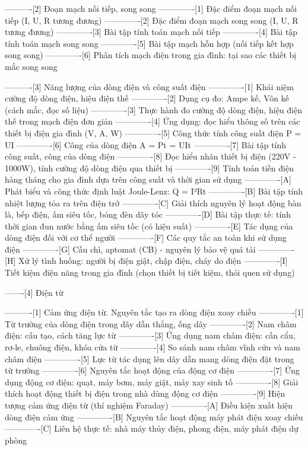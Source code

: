----------[2] Đoạn mạch nối tiếp, song song
-------------[1] Đặc điểm đoạn mạch nối tiếp (I, U, R tương đương)
-------------[2] Đặc điểm đoạn mạch song song (I, U, R tương đương)
-------------[3] Bài tập tính toán mạch nối tiếp
-------------[4] Bài tập tính toán mạch song song
-------------[5] Bài tập mạch hỗn hợp (nối tiếp kết hợp song song)
-------------[6] Phân tích mạch điện trong gia đình: tại sao các thiết bị mắc song song

----------[3] Năng lượng của dòng điện và công suất điện
-------------[1] Khái niệm cường độ dòng điện, hiệu điện thế
-------------[2] Dụng cụ đo: Ampe kế, Vôn kế (cách mắc, đọc số liệu)
-------------[3] Thực hành đo cường độ dòng điện, hiệu điện thế trong mạch điện đơn giản
-------------[4] Ứng dụng: đọc hiểu thông số trên các thiết bị điện gia đình (V, A, W)
-------------[5] Công thức tính công suất điện P = UI
-------------[6] Công của dòng điện A = Pt = UIt
-------------[7] Bài tập tính công suất, công của dòng điện
-------------[8] Đọc hiểu nhãn thiết bị điện (220V - 1000W), tính cường độ dòng điện qua thiết bị
-------------[9] Tính toán tiền điện hàng tháng cho gia đình dựa trên công suất và thời gian sử dụng
-------------[A] Phát biểu và công thức định luật Joule-Lenz: Q = I²Rt
-------------[B] Bài tập tính nhiệt lượng tỏa ra trên điện trở
-------------[C] Giải thích nguyên lý hoạt động bàn là, bếp điện, ấm siêu tốc, bóng đèn dây tóc
-------------[D] Bài tập thực tế: tính thời gian đun nước bằng ấm siêu tốc (có hiệu suất)
-------------[E] Tác dụng của dòng điện đối với cơ thể người
-------------[F] Các quy tắc an toàn khi sử dụng điện
-------------[G] Cầu chì, aptomat (CB) - nguyên lý bảo vệ quá tải
-------------[H] Xử lý tình huống: người bị điện giật, chập điện, cháy do điện
-------------[I] Tiết kiệm điện năng trong gia đình (chọn thiết bị tiết kiệm, thói quen sử dụng)

-------[4] Điện từ

----------[1] Cảm ứng điện từ. Nguyên tắc tạo ra dòng điện xoay chiều
-------------[1] Từ trường của dòng điện trong dây dẫn thẳng, ống dây
-------------[2] Nam châm điện: cấu tạo, cách tăng lực từ
-------------[3] Ứng dụng nam châm điện: cần cẩu, rơ-le, chuông điện, khóa cửa từ
-------------[4] So sánh nam châm vĩnh cửu và nam châm điện
-------------[5] Lực từ tác dụng lên dây dẫn mang dòng điện đặt trong từ trường
-------------[6] Nguyên tắc hoạt động của động cơ điện
-------------[7] Ứng dụng động cơ điện: quạt, máy bơm, máy giặt, máy xay sinh tố
-------------[8] Giải thích hoạt động thiết bị điện trong nhà dùng động cơ điện
-------------[9] Hiện tượng cảm ứng điện từ (thí nghiệm Faraday)
-------------[A] Điều kiện xuất hiện dòng điện cảm ứng
-------------[B] Nguyên tắc hoạt động máy phát điện xoay chiều
-------------[C] Liên hệ thực tế: nhà máy thủy điện, phong điện, máy phát điện dự phòng

